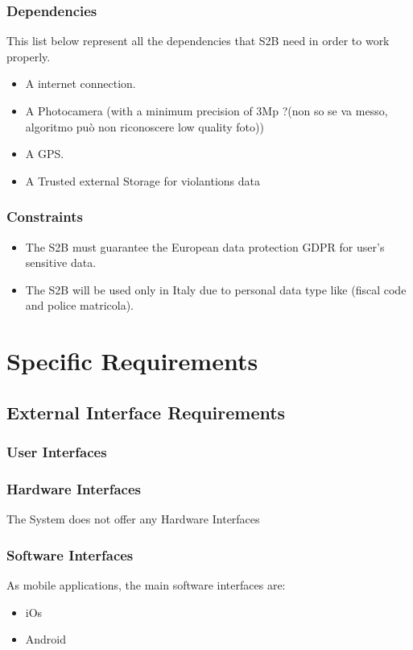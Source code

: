 \documentclass{article}
\begin{document}
\subsubsection{Dependencies}
This list below represent all the dependencies that S2B need in order to work properly.
\begin{itemize}
    \item A internet connection.
    \item A Photocamera (with a minimum precision of 3Mp ?(non so se va messo, algoritmo può non riconoscere low quality foto))
    \item A GPS.
    \item A Trusted external Storage for violantions data   
\end{itemize}

\subsubsection{Constraints}
\begin{itemize}
    \item The S2B must guarantee the European data protection GDPR for user's sensitive data.
    \item The S2B will be used only in Italy due to personal data type like (fiscal code and police matricola).
\end{itemize}

\section{Specific Requirements}

\subsection{External Interface Requirements}
\subsubsection{User Interfaces}
\subsubsection{Hardware Interfaces}
The System does not offer any Hardware Interfaces
\subsubsection{Software Interfaces}
As mobile applications, the main software interfaces are:
\begin{itemize}
    \item iOs
    \item Android
\end{itemize}
\end{document}
